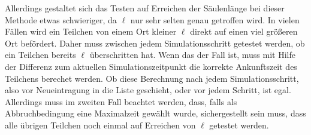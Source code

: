 Allerdings gestaltet sich das Testen auf Erreichen der Säulenlänge bei dieser Methode etwas schwieriger, da $\ell$ nur sehr selten genau getroffen wird. In vielen Fällen wird ein Teilchen von einem Ort kleiner $\ell$ direkt auf einen viel größeren Ort befördert. Daher muss zwischen jedem Simulationsschritt getestet werden, ob ein Teilchen bereits $\ell$ überschritten hat. Wenn das der Fall ist, muss mit Hilfe der Differenz zum aktuellen Simulationszeitpunkt die korrekte Ankunftszeit des Teilchens berechet werden.
Ob diese Berechnung nach jedem Simulationsschritt, also vor Neueintragung in die Liste geschieht, oder vor jedem Schritt, ist egal. Allerdings muss im zweiten Fall beachtet werden, dass, falls als Abbruchbedingung eine Maximalzeit gewählt wurde, sichergestellt sein muss, dass alle übrigen Teilchen noch einmal auf Erreichen von $\ell$ getestet werden.

